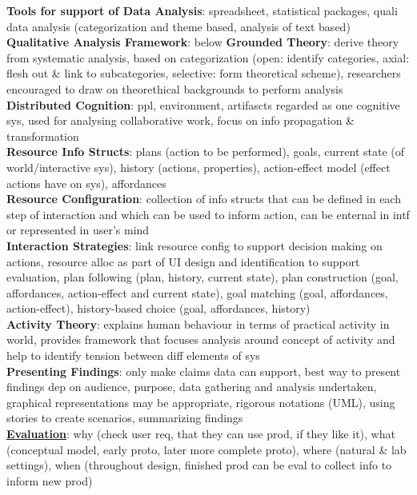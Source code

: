 \documentclass[a4paper]{article}
\begin{document}
\begin{multicols}{3}
        \textbf{Tools for support of Data Analysis}: spreadsheet, statistical packages, quali data analysis (categorization and theme based, analysis of text based)\\
        \textbf{Qualitative Analysis Framework}: below
        \textbf{Grounded Theory}: derive theory from systematic analysis, based on categorization (open: identify categories, axial: flesh out \& link to subcategories, selective: form theoretical scheme), researchers encouraged to draw on theorethical backgrounds to perform analysis\\
        \textbf{Distributed Cognition}: ppl, environment, artifascts regarded as one cognitive sys, used for analysing collaborative work, focus on info propagation \& transformation\\
        \textbf{Resource Info Structs}: plans (action to be performed), goals, current state (of world/interactive sys), history (actions, properties), action-effect model (effect actions have on sys), affordances\\
        \textbf{Resource Configuration}: collection of info structs that can be defined in each step of interaction and which can be used to inform action, can be enternal in intf or represented in user's mind\\
        \textbf{Interaction Strategies}: link resource config to support decision making on actions, resource alloc as part of UI design and identification to support evaluation, plan following (plan, history, current state), plan construction (goal, affordances, action-effect and current state), goal matching (goal, affordances, action-effect), history-based choice (goal, affordances, history)\\
        \textbf{Activity Theory}: explains human behaviour in terms of practical activity in world, provides framework that focuses analysis around concept of activity and help to identify tension between diff elements of sys\\
        \textbf{Presenting Findings}: only make claims data can support, best way to present findings dep on audience, purpose, data gathering and analysis undertaken, graphical representations may be appropriate, rigorous notations (UML), using stories to create scenarios, summarizing findings\\
        \underline{\textbf{Evaluation}}: why (check user req, that they can use prod, if they like it), what (conceptual model, early proto, later more complete proto), where (natural \& lab settings), when (throughout design, finished prod can be eval to collect info to inform new prod)\\

\end{multicols}
\end{document}
